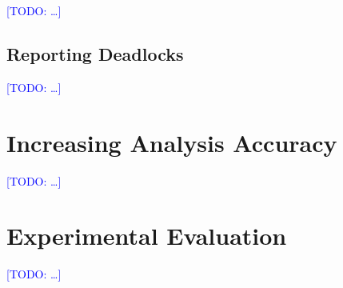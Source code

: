 \documentclass[runningheads]{llncs}
\newcommand{\todo}[1]{\textcolor{blue}{[TODO: #1]}}
\begin{document}
\todo{\ldots}

\subsection{Reporting Deadlocks}

\todo{\ldots}

\section{Increasing Analysis Accuracy}
\label{sec:heuristics}

\todo{\ldots}


\section{Experimental Evaluation}
\label{sec:experiments}

\todo{\ldots}
\cite{kroening16}

\end{document}
